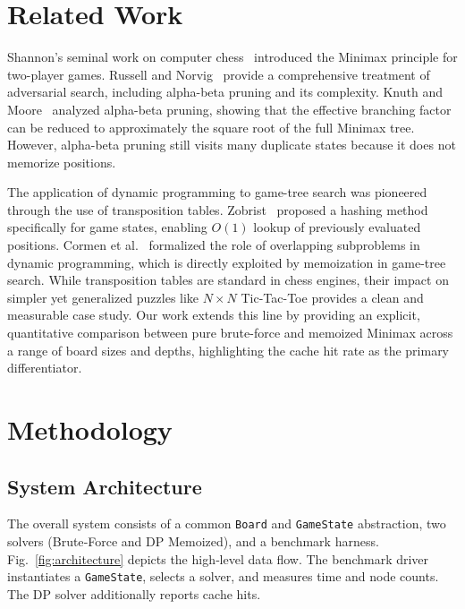 \documentclass[conference]{IEEEtran}
\begin{document}
\section{Related Work}

Shannon’s seminal work on computer chess~\cite{b2} introduced the
Minimax principle for two-player games. Russell and Norvig~\cite{b1}
provide a comprehensive treatment of adversarial search, including
alpha-beta pruning and its complexity. Knuth and Moore~\cite{b3}
analyzed alpha-beta pruning, showing that the effective branching factor
can be reduced to approximately the square root of the full Minimax
tree. However, alpha-beta pruning still visits many duplicate states
because it does not memorize positions.

The application of dynamic programming to game-tree search was
pioneered through the use of transposition tables. Zobrist~\cite{b5}
proposed a hashing method specifically for game states, enabling $O(1)$
lookup of previously evaluated positions. Cormen et al.~\cite{b4}
formalized the role of overlapping subproblems in dynamic programming,
which is directly exploited by memoization in game-tree search. While
transposition tables are standard in chess engines, their impact on
simpler yet generalized puzzles like $N \times N$ Tic-Tac-Toe provides
a clean and measurable case study. Our work extends this line by
providing an explicit, quantitative comparison between pure brute-force
and memoized Minimax across a range of board sizes and depths,
highlighting the cache hit rate as the primary differentiator.

\section{Methodology}

\subsection{System Architecture}
The overall system consists of a common \texttt{Board} and
\texttt{GameState} abstraction, two solvers (Brute‑Force and DP
Memoized), and a benchmark harness. Fig.~\ref{fig:architecture} depicts
the high‑level data flow. The benchmark driver instantiates a
\texttt{GameState}, selects a solver, and measures time and node counts.
The DP solver additionally reports cache hits.
\end{document}
